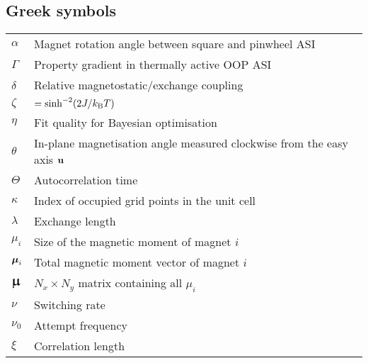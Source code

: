 \subsection*{Greek symbols}
\begin{longtable}[l]{p{50pt} p{295pt}}
	$\alpha$ & Magnet rotation angle between square and pinwheel ASI\vspace{\whiteline}\\
	
	$\Gamma$ & Property gradient in thermally active OOP ASI\vspace{\whiteline}\\

	$\delta$ & Relative magnetostatic/exchange coupling\vspace{\whiteline}\\
	
	$\zeta$ & $=\sinh^{-2}(2J/\kBT)$\vspace{\whiteline}\\
	
	$\eta$ & Fit quality for Bayesian optimisation\vspace{\whiteline}\\

	$\theta$ & In-plane magnetisation angle measured clockwise from the easy axis $\boldsymbol{\mathbf{u}}$ \\
	$\Theta$ & Autocorrelation time\vspace{\whiteline}\\
	
	$\kappa$ & Index of occupied grid points in the unit cell\vspace{\whiteline}\\
	
	$\lambda$ & Exchange length\vspace{\whiteline}\\

	$\mu_i$ & Size of the magnetic moment of magnet $i$ \\
	$\boldsymbol{\mathbf{\mu}}_i$ & Total magnetic moment vector of magnet $i$ \\
	$\vc{\bigmu}$ & $N_x \times N_y$ matrix containing all $\mu_i$\vspace{\whiteline}\\
	
	$\nu$ & Switching rate \\
	$\nu_0$ & Attempt frequency\vspace{\whiteline}\\
	
	$\xi$ & Correlation length\vspace{\whiteline}\\


\end{longtable}
